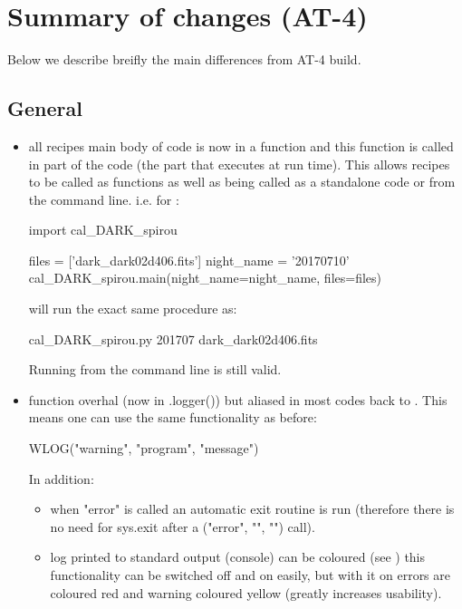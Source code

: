 \chapter{Summary of changes (AT-4)}
\label{ch:changelog}

Below we describe breifly the main differences from AT-4 build.

\section{General}
\begin{itemize}

\item all recipes main body of code is now in a  function and this function is called in  part of the code (the part that executes at run time). This allows recipes to be called as functions as well as being called as a standalone code or from the command line. i.e. for \calDARK:
	\begin{pythonbox}
	import cal_DARK_spirou
	    
	files = ['dark_dark02d406.fits']
	night_name = '20170710'
	cal_DARK_spirou.main(night_name=night_name, files=files)
	\end{pythonbox}
	will run the exact same procedure as:
	\begin{cmdbox}
	cal_DARK_spirou.py 201707 dark_dark02d406.fits
	\end{cmdbox}
	Running from the command line is still valid.

\item \WLOG function overhal (now in \spirouLog.logger()) but aliased in most codes back to \WLOG. This means one can use the same functionality as before:
	\begin{pythonbox}
	WLOG("warning", "program", "message")
	\end{pythonbox}
	In addition:
	\begin{itemize}
	\item when "error" is called an automatic exit routine is run (therefore there is no need for sys.exit after a \WLOG("error", "", "") call).

	\item log printed to standard output (console) can be coloured (see ) this functionality can be switched off and on easily, but with it on errors are coloured red and warning coloured yellow (greatly increases usability).


\end{itemize}
\end{itemize}
